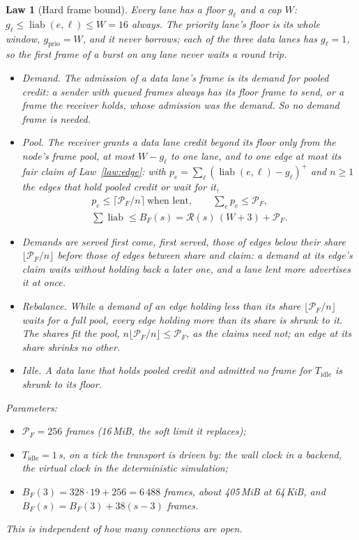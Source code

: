 \documentclass[journal]{IEEEtran}
\newtheorem{law}{Law}
\newcommand{\Rg}{\mathcal{R}}
\newcommand{\Pool}{\mathcal{P}}
\newcommand{\liab}{\operatorname{liab}}
\begin{document}
\begin{law}[Hard frame bound]\label{law:frames}
Every lane has a floor $g_\ell$ and a cap $W$: $g_\ell\le\liab(e,\ell)\le W=16$ always.  The
priority lane's floor is its whole window, $g_{\mathrm{prio}}=W$, and it never borrows; each of
the three data lanes has $g_\ell=1$, so the first frame of a burst on any lane never waits a
round trip.
\begin{itemize}[leftmargin=1.2em]
\item \emph{Demand.}  The admission of a data lane's frame is its demand for pooled credit: a
sender with queued frames always has its floor frame to send, or a frame the receiver holds,
whose admission was the demand.  So no demand frame is needed.
\item \emph{Pool.}  The receiver grants a data lane credit beyond its floor only from the
node's frame pool, at most $W-g_\ell$ to one lane, and to one edge at most its fair claim of
Law~\ref{law:edge}: with $p_e=\sum_\ell(\liab(e,\ell)-g_\ell)^+$ and $n\ge1$ the edges that hold
pooled credit or wait for it,
\begin{gather*}
\textstyle p_e\le\lceil\Pool_F/n\rceil\ \text{when lent},\qquad\sum_e p_e\le\Pool_F,\\
\textstyle\sum\liab\le B_F(s)=\Rg(s)\,(W+3)+\Pool_F .
\end{gather*}
\item Demands are served first come, first served, those of edges below their share
$\lfloor\Pool_F/n\rfloor$ before those of edges between share and claim: a demand at its edge's
claim waits without holding back a later one, and a lane lent more advertises it at once.
\item \emph{Rebalance.}  While a demand of an edge holding less than its share
$\lfloor\Pool_F/n\rfloor$ waits for a full pool, every edge holding more than its share is
shrunk to it.  The shares fit the pool, $n\lfloor\Pool_F/n\rfloor\le\Pool_F$, as the claims need
not; an edge at its share shrinks no other.
\item \emph{Idle.}  A data lane that holds pooled credit and admitted no frame for
$T_{\mathrm{idle}}$ is shrunk to its floor.
\end{itemize}
Parameters:
\begin{itemize}[leftmargin=1.2em]
\item $\Pool_F=256$ frames (16\,MiB, the soft limit it replaces);
\item $T_{\mathrm{idle}}=1$\,s, on a tick the transport is driven by: the wall clock in a
backend, the virtual clock in the deterministic simulation;
\item $B_F(3)=328\cdot19+256=6\,488$ frames, about 405\,MiB at 64\,KiB, and
$B_F(s)=B_F(3)+38(s-3)$ frames.
\end{itemize}
This is independent of how many connections are open.
\end{law}
\end{document}
